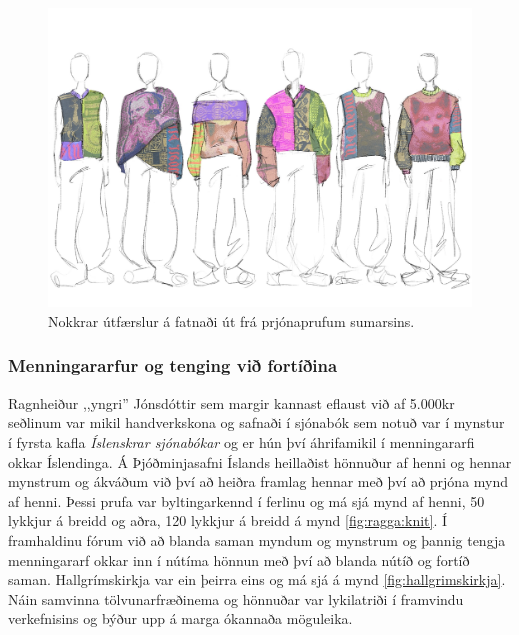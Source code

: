 \begin{figure}
    \centering
    \includegraphics[width=\linewidth]{myndir/gisa/collection.JPG}
    \caption{Nokkrar útfærslur á fatnaði út frá prjónaprufum sumarsins.}
    \label{fig:designproposal}
\end{figure}

\subsubsection{Menningararfur og tenging við fortíðina}
Ragnheiður ,,yngri'' Jónsdóttir sem margir kannast eflaust við af 5.000kr seðlinum var mikil handverkskona og safnaði í sjónabók sem notuð var í mynstur í fyrsta kafla \textit{Íslenskrar sjónabókar} og er hún því áhrifamikil í menningararfi okkar Íslendinga. Á Þjóðminjasafni Íslands heillaðist hönnuður af henni og hennar mynstrum og ákváðum við því að heiðra framlag hennar með því að prjóna mynd af henni. Þessi prufa var byltingarkennd í ferlinu og má sjá mynd af henni, 50 lykkjur á breidd og aðra, 120 lykkjur á breidd á mynd \ref{fig:ragga:knit}. Í framhaldinu fórum við að blanda saman myndum og mynstrum og þannig tengja menningararf okkar inn í nútíma hönnun með því að blanda nútíð og fortíð saman. Hallgrímskirkja var ein þeirra eins og má sjá á mynd \ref{fig:hallgrimskirkja}. Náin samvinna tölvunarfræðinema og hönnuðar var lykilatriði í framvindu verkefnisins og býður upp á marga ókannaða möguleika. 

